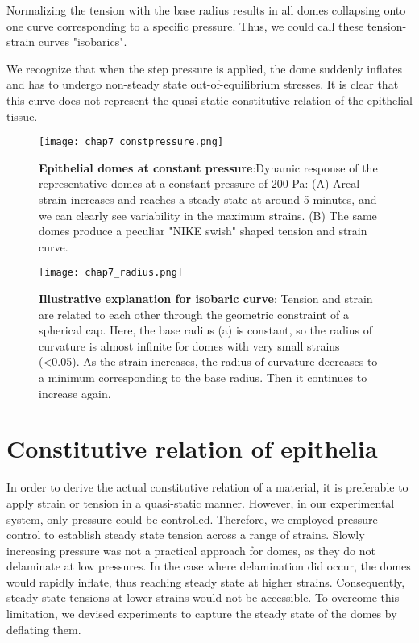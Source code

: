 Normalizing the tension with the base radius results in all domes collapsing onto one curve corresponding to a specific pressure. Thus, we could call these tension-strain curves "isobarics".

We recognize that when the step pressure is applied, the dome suddenly inflates and has to undergo non-steady state out-of-equilibrium stresses. It is clear that this curve does not represent the quasi-static constitutive relation of the epithelial tissue.

\begin{figure}[t]
	\centering
	\texttt{[image: chap7\_constpressure.png]}
	\caption{\label{fig_7_3} \textbf{Epithelial domes at constant pressure}:Dynamic response of the representative domes at a constant pressure of 200 Pa: (A) Areal strain increases and reaches a steady state at around 5 minutes, and we can clearly see variability in the maximum strains. (B) The same domes produce a peculiar "NIKE swish" shaped tension and strain curve.
	}
\end{figure}

\begin{figure}
	\centering
	\texttt{[image: chap7\_radius.png]}
	\caption{\label{fig_7_4} \textbf{Illustrative explanation for isobaric curve}: Tension and strain are related to each other through the geometric constraint of a spherical cap. Here, the base radius (a) is constant, so the radius of curvature is almost infinite for domes with very small strains (<0.05). As the strain increases, the radius of curvature decreases to a minimum corresponding to the base radius. Then it continues to increase again.	
	}
\end{figure}



\hypertarget{constitutive-relation-of-epithelia}{%
	\section{Constitutive relation of
		epithelia}\label{constitutive-relation-of-epithelia}}

In order to derive the actual constitutive relation of a material, it is preferable to apply strain or tension in a quasi-static manner. However, in our experimental system, only pressure could be controlled. Therefore, we employed pressure control to establish steady state tension across a range of strains. Slowly increasing pressure was not a practical approach for domes, as they do not delaminate at low pressures. In the case where delamination did occur, the domes would rapidly inflate, thus reaching steady state at higher strains. Consequently, steady state tensions at lower strains would not be accessible. To overcome this limitation, we devised experiments to capture the steady state of the domes by deflating them.

